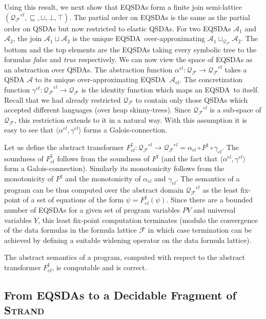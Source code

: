 \documentclass{llncs}
\newcommand{\tuple}[1]{\langle #1 \rangle}
\newcommand{\lub}{\sqcup}
\newcommand{\Strand}{\textsc{Strand}\xspace}
\newcommand{\A}{\mathcal{A}}
\newcommand{\AEL}{\A_\text{el}}
\newcommand{\PV}{\mathit{PV}}
\newcommand{\EQSDA}{\mbox{\sc EQSDA}}
\newcommand{\F}{\mathcal{F}}
\begin{document}
Using this result, we next show that \EQSDA s form a finite join semi-lattice $(\mathcal{Q_F}^{el}, \sqsubseteq, \lub, \bot, \top)$. The partial order on \EQSDA s is the same as the partial order on QSDAs but now restricted to elastic QSDAs.
For two \EQSDA s $\A_1$ and $\A_2$, the join $\A_1 \lub \A_2$ is the unique \EQSDA\ over-approximating $\A_1 \lub_{\mathcal{Q_F}} \A_2$. The bottom and the top elements are the \EQSDA s taking every symbolic tree to the formulas \emph{false} and \emph{true} respectively.
We can now view the space of \EQSDA s as an abstraction over  QSDAs.
The abstraction function $\alpha^{el}: \mathcal{Q_F} \rightarrow \mathcal{Q_F}^{el}$  takes a QSDA $\A$ to its unique over-approximating \EQSDA\ $\AEL$. The concretization function $\gamma^{el}: \mathcal{Q_F}^{el} \rightarrow \mathcal{Q_F}$ is the identity function which maps an \EQSDA\ to itself. Recall that we had already restricted $\mathcal{Q_F}$ to contain only those QSDAs which accepted different languages (over heap skinny-trees). Since $\mathcal{Q_F}^{el}$ is a sub-space of $\mathcal{Q_F}$, this restriction extends to it in a natural way. With this assumption it is easy to see that $\tuple{\alpha^{el}, \gamma^{el}}$ forms a Galois-connection.

Let us define the abstract transformer $F_{el}^\sharp: \mathcal{Q_F}^{el} \rightarrow \mathcal{Q_F}^{el} = \alpha_{el} \circ F^\sharp \circ \gamma_{el}$. The soundness of $F_{el}^\sharp$ follows from the soundness of $F^\sharp$ (and the fact that $\tuple{\alpha^{el}, \gamma^{el}}$ form a Galois-connection). Similarly its monotonicity follows from the monotonicity of $F^\sharp$ and the monotonicity of $\alpha_{el}$ and $\gamma_{el}$. The semantics of a program can be thus computed over the abstract domain $\mathcal{Q_F}^{el}$ as the least fix-point of a set of equations of the form $\psi = F_{el}^\sharp (\psi)$.
Since there are a bounded number of \EQSDA s for a given set of program variables $\PV$ and universal variables $Y$, this least fix-point computation terminates (modulo the convergence of the data formulas in the formula lattice $\F$ in which case termination can be achieved by defining a suitable widening operator on the data formula lattice).

\begin{theorem}
The abstract semantics of a program, computed with respect to the abstract transformer $F_{el}^\sharp$, is computable and is correct.
\end{theorem}


\subsection{From \EQSDA s to a Decidable Fragment of \Strand}
\label{sec-translation}
\end{document}
